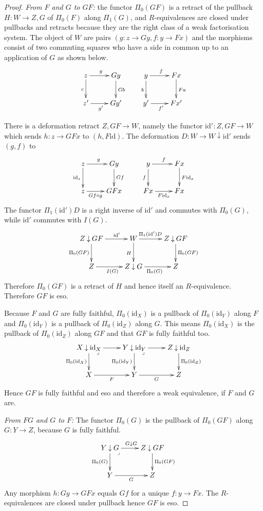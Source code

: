 \documentclass{amsart}
\theoremstyle{plain}
\theoremstyle{definition}
\newcommand\id{\mathrm{id}}
\begin{document}
\begin{proof} \emph{From $F$ and $G$ to $GF$:} the functor $\Pi_0(GF)$ is a retract of the pullback $H:W\to Z\comma G$ of $\Pi_0(F)$ along $\Pi_1(G)$, and $R$-equivalences are closed under pullbacks and retracts because they are the right class of a weak factorisation system. The object of $W$ are pairs $(g:z\to Gy,f:y\to Fx)$ and the morphisms consist of two commuting squares who have a side in common up to an application of $G$ as shown below.
\[ \xymatrix{
z\ar[d]_c\ar[r]^g & Gy\ar[d]^{Gb} & y\ar[d]_b\ar[r]^f & Fx\ar[d]^{Fa} \\
z'\ar[r]_{g'} & Gy' & y'\ar[r]_{f'} & Fx'
}\]

There is a deformation retract $Z\comma GF \to W$, namely the functor $\id':Z\comma GF\to W$ which sends $h:z\to GFx$ to $(h, F\id)$. The deformation $D:W\to W\downarrow\id'$ sends $(g,f)$ to
\[ \xymatrix{
z\ar[d]_{\id_z}\ar[r]^g & Gy\ar[d]^{Gf} & y\ar[d]_f\ar[r]^f & Fx\ar[d]^{F\id_x} \\
z\ar[r]_(.4){Gf\circ g} & GFx & Fx\ar[r]_{F\id_x} & Fx
}\]
The functor $\Pi_1(\id')D$ is a right inverse of $\id'$ and commutes with $\Pi_0(G)$, while $\id'$ commutes with $I(G)$.
\[ \xymatrix{
Z\comma GF \ar[r]^(.6){\id'}\ar[d]_{\Pi_0(GF)} & W \ar[r]^(.4){\Pi_1(\id')D}\ar[d]_H & Z\comma GF\ar[d]^{\Pi_0(GF)} \\
Z \ar[r]_{I(G)} & Z\comma G \ar[r]_{\Pi_0(G)} & Z 
}\]
Therefore $\Pi_0(GF)$ is a retract of $H$ and hence itself an $R$-equivalence. Therefore $GF$ is eso.

Because $F$ and $G$ are fully faithful, $\Pi_0(\id_X)$ is a pullback of $\Pi_0(\id_Y)$ along $F$ and $\Pi_0(\id_Y)$ is a pullback of $\Pi_0(\id_Z)$ along $G$. This means $\Pi_0(\id_X)$ is the pullback of $\Pi_0(\id_Z)$ along $GF$ and that $GF$ is fully faithful too. 
\[ \xymatrix{
X\comma\id_X\ar[d]_{\Pi_0(\id_X)}\ar[r]\ar@{}[dr]|<\lrcorner&Y\ar[r]\comma\id_Y\ar[d]_{\Pi_0(\id_Y)}\ar@{}[dr]|<\lrcorner&Z\comma\id_Z\ar[d]^{\Pi_0(\id_Z)}\\
X\ar[r]_F & Y\ar[r]_G & Z
}\]
Hence $GF$ is fully faithful and eso and therefore a weak equivalence, if $F$ and $G$ are.

\emph{From $FG$ and $G$ to $F$:} The functor $\Pi_0(G)$ is the pullback of $\Pi_0(GF)$ along $G:Y\to Z$, because $G$ is fully faithful.
\[ \xymatrix{
Y\comma G \ar[d]_{\Pi_0(G)} \ar[r]^{G\comma G} \ar@{}[dr]|<\lrcorner & Z\comma GF\ar[d]^{\Pi_0(GF)} \\
Y \ar[r]_G & Z
}\]
Any morphism $h:Gy \to GFx$ equals $Gf$ for a unique $f:y\to Fx$. The $R$-equivalences are closed under pullback hence $GF$ is eso.


\end{proof}
\end{document}
